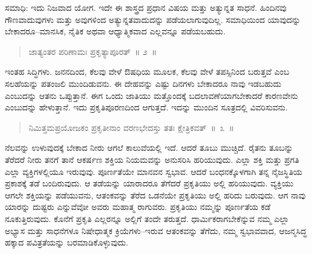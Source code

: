 ಸಮಾಧಿ: ಇದು ನಿಜವಾದ ಯೋಗ. ಇದೇ ಈ ಶಾಸ್ತ್ರದ ಪ್ರಧಾನ ವಿಷಯ ಮತ್ತು ಅತ್ಯುನ್ನತ ಸಾಧನೆ. ಹಿಂದಿನವು ಗೌಣವಾದುವುಗಳು ಮತ್ತು ಅವುಗಳಿಂದ ಅತ್ಯುನ್ನತವಾದುದನ್ನು ಪಡೆಯಲಾಗುವುದಿಲ್ಲ. ಸಮಾಧಿಯಿಂದ ಯಾವುದನ್ನು ಬೇಕಾದರೂ–ಮಾನಸಿಕ, ನೈತಿಕ ಅಥವಾ ಆಧ್ಯಾತ್ಮಿಕವಾದ ಎಲ್ಲವನ್ನೂ ಪಡೆಯಬಹುದು. 

\vspace{-0.35cm}

\begin{verse}
ಜಾತ್ಯಂತರ ಪರಿಣಾಮಃ ಪ್ರಕೃತ್ಯಾಪೂರತ್​~॥ ೨~॥
\end{verse}

\vspace{-0.35cm}


ಇಂತಹ ಸಿದ್ಧಿಗಳು. ಜನನದಿಂದ, ಕೆಲವು ವೇಳೆ ಔಷಧಿಯ ಮೂಲಕ, ಕೆಲವು ವೇಳೆ ತಪಸ್ಸಿನಿಂದ ಬರುತ್ತವೆ ಎಂಬ ಸಲಹೆಯನ್ನು ಪತಂಜಲಿ ಮುಂದಿಡುವನು. ಈ ದೇಹವನ್ನು ಎಷ್ಟು ದಿನಗಳು ಬೇಕಾದರೂ ನಾವು ಇಡಬಹುದು ಎಂಬುದನ್ನು ಆತನು ಒಪ್ಪುತ್ತಾನೆ. ಈಗ ಒಂದು ಜಾತಿಯು ಮತ್ತೊಂದಕ್ಕೆ ಬದಲಾವಣೆಯಾಗಬೇಕಾದರೆ ಕಾರಣವೇನು ಎಂಬುದನ್ನು ಹೇಳುತ್ತಾನೆ. ಇದು ಪ್ರಕೃತಿಪೂರಣದಿಂದ ಆಗುತ್ತದೆ. ಇದನ್ನು ಮುಂದಿನ ಸೂತ್ರದಲ್ಲಿ ವಿವರಿಸುವನು. 

\vspace{-0.3cm}

\begin{verse}
ನಿಮಿತ್ತಮಪ್ರಯೋಜಕಂ ಪ್ರಕೃತೀನಾಂ ವರಣಭೇದಸ್ತು ತತಃ ಕ್ಷೇತ್ರಿಕವತ್​~॥~೩~॥
\end{verse}

\vspace{-0.3cm}


ನೆಲವನ್ನು ಉಳುವುದಕ್ಕೆ ಬೇಕಾದ ನೀರು ಆಗಲೆ ಕಾಲುವೆಯಲ್ಲಿ ಇದೆ. ಆದರೆ ತೂಬು ಮುಚ್ಚಿದೆ. ರೈತನು ತೂಬನ್ನು ತೆರೆದರೆ ನೀರು ತನಗೆ ತಾನೆ ಆಕರ್ಷಣ ಶಕ್ತಿಯ ನಿಯಮವನ್ನು ಅನುಸರಿಸಿ ಹರಿಯುವುದು. ಎಲ್ಲಾ ಶಕ್ತಿ ಮತ್ತು ಪ್ರಗತಿ ಎಲ್ಲಾ ವ್ಯಕ್ತಿಗಳಲ್ಲಿಯೂ ಇರುವುವು. ಪೂರ್ಣತೆಯೇ ಮಾನವನ ಸ್ವಭಾವ. ಆದರೆ ಬಂಧನಕ್ಕೊಳಗಾಗಿ ತನ್ನ ನೈಜಸ್ಥಿತಿಯ ಪ್ರಕಾಶಕ್ಕೆ ತಡೆ ಬಂದಿರುವುದು. ಆ ತಡೆಯನ್ನು ಯಾರಾದರೂ ತೆಗೆದರೆ ಪ್ರಕೃತಿಯು ಅಲ್ಲಿ ಹರಿಯುವುದು. ವ್ಯಕ್ತಿಯು ಆಗಲೇ ಶಕ್ತಿಯನ್ನು ಪಡೆಯುವನು, ಆತಂಕವನ್ನು ತೆರೆದ ಒಡನೆಯೇ ಪ್ರಕೃತಿಯು ಅಲ್ಲಿ ಹರಿದು ಬರುವುದು. ಆಗ ನಾವು ಯಾರನ್ನು ದುಷ್ಟರು ಎನ್ನುವೆವೋ ಅವರು ಮಹಾತ್ಮ ರಾಗುವರು. ಪ್ರಕೃತಿಯು ನಮ್ಮನ್ನು ಪೂರ್ಣತೆಯ ಕಡೆ ನೂಕುತ್ತಿರುವುದು. ಕೊನೆಗೆ ಪ್ರಕೃತಿ ಎಲ್ಲರನ್ನೂ ಅಲ್ಲಿಗೆ ತಂದೇ ತರುತ್ತದೆ. ಧಾರ್ಮಿಕರಾಗಬೇಕೆನ್ನುವ ನಮ್ಮ ಎಲ್ಲಾ ಅಭ್ಯಾಸ ಮತ್ತು ಸಾಧನೆಗಳೂ ನಿಷೇಧಾತ್ಮಕ ಕ್ರಿಯೆಗಳು–ಇರುವ ಆತಂಕವನ್ನು ತೆಗೆದು, ನಮ್ಮ ಸ್ವಭಾವವಾದ, ಆಜನ್ಮಸಿದ್ಧ ಹಕ್ಕಾದ ಪವಿತ್ರತೆಯನ್ನು ಬರಮಾಡಿಕೊಳ್ಳುವುದು. 

